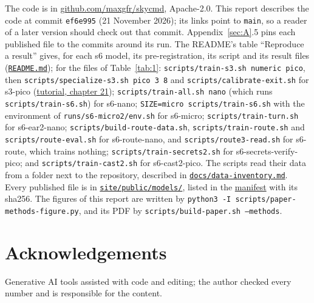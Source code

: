 \documentclass[10pt]{article}
\begin{document}
The code is in \href{https://github.com/maxgfr/skycmd}{github.com/maxgfr/skycmd}, Apache-2.0. This report describes the code at commit \texttt{ef6e995} (21 November 2026); its links point to \texttt{main}, so a reader of a later version should check out that commit. Appendix~\ref{sec:A}.5 pins each published file to the commits around its run. The README's table ``Reproduce a result'' gives, for each s6 model, its pre-registration, its script and its result files (\href{https://github.com/maxgfr/skycmd/blob/main/README.md\#reproduce-a-result}{\texttt{README.md}}); for the files of Table~\ref{tab:1}: \texttt{scripts/\allowbreak{}train-s3.sh numeric pico}, then \texttt{scripts/\allowbreak{}specialize-s3.sh pico 3 8} and \texttt{scripts/\allowbreak{}calibrate-exit.sh} for s3-pico (\href{https://maxgfr.github.io/skycmd/tutorial/21-s3-recursive-tiny}{tutorial, chapter 21}); \texttt{scripts/\allowbreak{}train-all.sh nano} (which runs \texttt{scripts/\allowbreak{}train-s6.sh}) for s6-nano; \texttt{SIZE=micro scripts/\allowbreak{}train-s6.sh} with the environment of \texttt{runs/\allowbreak{}s6-micro2/\allowbreak{}env.sh} for s6-micro; \texttt{scripts/\allowbreak{}train-turn.sh} for s6-ear2-nano; \texttt{scripts/\allowbreak{}build-route-data.sh}, \texttt{scripts/\allowbreak{}train-route.sh} and \texttt{scripts/\allowbreak{}route-eval.sh} for s6-route-nano, and \texttt{scripts/\allowbreak{}route3-read.sh} for s6-route, which trains nothing; \texttt{scripts/\allowbreak{}train-secrets2.sh} for s6-secrets-verify-pico; and \texttt{scripts/\allowbreak{}train-cast2.sh} for s6-cast2-pico. The scripts read their data from a folder next to the repository, described in \href{https://github.com/maxgfr/skycmd/blob/main/docs/data-inventory.md}{\texttt{docs/\allowbreak{}data-inventory.md}}. Every published file is in \href{https://github.com/maxgfr/skycmd/tree/main/site/public/models}{\texttt{site/\allowbreak{}public/\allowbreak{}models/\allowbreak{}}}, listed in the \href{https://maxgfr.github.io/skycmd/models/manifest.json}{manifest} with its sha256. The figures of this report are written by \texttt{python3 -I scripts/\allowbreak{}paper-methods-figure.py}, and its PDF by \texttt{scripts/\allowbreak{}build-paper.sh --methods}.

\section*{Acknowledgements}

Generative AI tools assisted with code and editing; the author checked every number and is responsible for the content.
\end{document}

